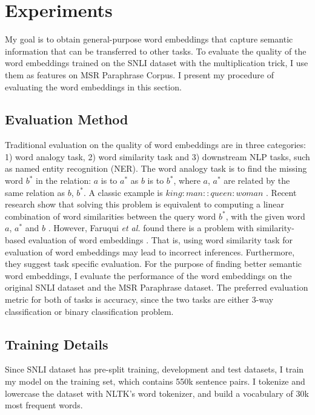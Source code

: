 \documentclass{article}
\newcommand{\etal}{\emph{et al. }}
\begin{document}
\section{Experiments}
My goal is to obtain general-purpose word embeddings that capture semantic information that can be transferred to other tasks. To evaluate the quality of the word embeddings trained on the SNLI dataset with the multiplication trick, I use them as features on MSR Paraphrase Corpus. I present my procedure of evaluating the word embeddings in this section.

\subsection{Evaluation Method}
Traditional evaluation on the quality of word embeddings are in three categories: 1) word analogy task, 2) word similarity task and 3) downstream NLP tasks, such as named entity recognition (NER). The word analogy task is to find the missing word $b^*$ in the relation: $a$ is to $a^*$ as $b$ is to $b^*$, where $a$, $a^*$ are related by the same relation as $b$, $b^*$. A classic example is $king : man :: queen : woman$ \cite{mikolov2013distributed}. Recent research show that solving this problem is equivalent to computing a linear combination of word similarities between the query word $b^*$, with the given word $a$, $a^*$ and $b$ \cite{levy2014linguistic}. However, Faruqui \etal found there is a problem with similarity-based evaluation of word embeddings \cite{faruqui2016problems}. That is, using word similarity task for evaluation of word embeddings may lead to incorrect inferences. Furthermore, they suggest task specific evaluation. For the purpose of finding better semantic word embeddings, I evaluate  the performance of the word embeddings on the original SNLI dataset and the MSR Paraphrase dataset. The preferred evaluation metric for both of tasks is accuracy, since the two tasks are either 3-way classification or binary classification problem.

\subsection{Training Details}
Since SNLI dataset has pre-split training, development and test datasets, I train my model on the training set, which contains 550k sentence pairs. I tokenize and lowercase the dataset with NLTK's word tokenizer, and build a vocabulary of 30k most frequent words.
\end{document}
